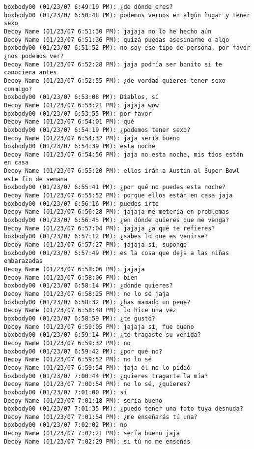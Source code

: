 \begin{verbatim}
boxbody00 (01/23/07 6:49:19 PM): ¿de dónde eres?
boxbody00 (01/23/07 6:50:48 PM): podemos vernos en algún lugar y tener sexo
Decoy Name (01/23/07 6:51:30 PM): jajaja no lo he hecho aún
Decoy Name (01/23/07 6:51:36 PM): quizá puedas asesinarme o algo
boxbody00 (01/23/07 6:51:52 PM): no soy ese tipo de persona, por favor ¿nos podemos ver?
Decoy Name (01/23/07 6:52:28 PM): jaja podría ser bonito si te conociera antes
Decoy Name (01/23/07 6:52:55 PM): ¿de verdad quieres tener sexo conmigo?
boxbody00 (01/23/07 6:53:08 PM): Diablos, sí
Decoy Name (01/23/07 6:53:21 PM): jajaja wow
boxbody00 (01/23/07 6:53:55 PM): por favor
Decoy Name (01/23/07 6:54:01 PM): qué
boxbody00 (01/23/07 6:54:19 PM): ¿podemos tener sexo?
Decoy Name (01/23/07 6:54:32 PM): jaja sería bueno
boxbody00 (01/23/07 6:54:39 PM): esta noche
Decoy Name (01/23/07 6:54:56 PM): jaja no esta noche, mis tíos están en casa
Decoy Name (01/23/07 6:55:20 PM): ellos irán a Austin al Super Bowl este fin de semana
boxbody00 (01/23/07 6:55:41 PM): ¿por qué no puedes esta noche?
Decoy Name (01/23/07 6:55:52 PM): porque ellos están en casa jaja
boxbody00 (01/23/07 6:56:16 PM): puedes irte
Decoy Name (01/23/07 6:56:28 PM): jajaja me metería en problemas
boxbody00 (01/23/07 6:56:45 PM): ¿en dónde quieres que me venga?
Decoy Name (01/23/07 6:57:04 PM): jajaja ¿a qué te refieres?
boxbody00 (01/23/07 6:57:12 PM): ¿sabes lo que es venirse?
Decoy Name (01/23/07 6:57:27 PM): jajaja sí, supongo
boxbody00 (01/23/07 6:57:49 PM): es la cosa que deja a las niñas embarazadas
Decoy Name (01/23/07 6:58:06 PM): jajaja 
Decoy Name (01/23/07 6:58:06 PM): bien
boxbody00 (01/23/07 6:58:14 PM): ¿dónde quieres?
Decoy Name (01/23/07 6:58:25 PM): no lo sé jaja
boxbody00 (01/23/07 6:58:32 PM): ¿has mamado un pene?
Decoy Name (01/23/07 6:58:48 PM): lo hice una vez
boxbody00 (01/23/07 6:58:59 PM): ¿te gustó?
Decoy Name (01/23/07 6:59:05 PM): jajaja sí, fue bueno
boxbody00 (01/23/07 6:59:14 PM): ¿te tragaste su venida?
Decoy Name (01/23/07 6:59:32 PM): no
boxbody00 (01/23/07 6:59:42 PM): ¿por qué no?
Decoy Name (01/23/07 6:59:52 PM): no lo sé
Decoy Name (01/23/07 6:59:54 PM): jaja él no lo pidió
boxbody00 (01/23/07 7:00:44 PM): ¿quieres tragarte la mía?
Decoy Name (01/23/07 7:00:54 PM): no lo sé, ¿quieres?
boxbody00 (01/23/07 7:01:00 PM): sí
Decoy Name (01/23/07 7:01:18 PM): sería bueno
boxbody00 (01/23/07 7:01:35 PM): ¿puedo tener una foto tuya desnuda?
Decoy Name (01/23/07 7:01:54 PM): ¿me enseñarás tú una?
boxbody00 (01/23/07 7:02:02 PM): no
Decoy Name (01/23/07 7:02:21 PM): sería bueno jaja
Decoy Name (01/23/07 7:02:29 PM): si tú no me enseñas

\end{verbatim}
